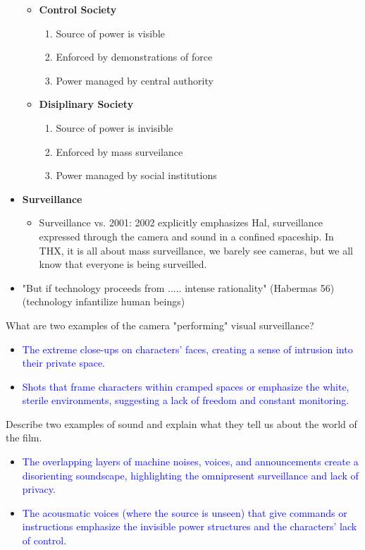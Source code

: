 \documentclass[11pt,fleqn]{book} %
\begin{document}
\begin{itemize}
\begin{itemize}
        \item \textbf{Control Society}
        \begin{enumerate}
            \item Source of power is visible
            \item Enforced by demonstrations of force
            \item Power managed by central authority
        \end{enumerate}
        \item \textbf{Disiplinary Society}
        \begin{enumerate}
            \item Source of power is invisible
            \item Enforced by mass surveilance
            \item Power managed by social institutions
        \end{enumerate}
    \end{itemize}
    \item \textbf{Surveillance}
    \begin{itemize}
        \item Surveillance vs. 2001: 2002 explicitly emphasizes Hal, surveillance expressed through the camera and sound in a confined spaceship. In THX, it is all about mass surveillance, we barely see cameras, but we all know that everyone is being surveilled.
    \end{itemize}
    \item "But if technology proceeds from ..... intense rationality" (Habermas 56) (technology infantilize human beings)
\end{itemize}
\begin{exercise}
What are two examples of the camera "performing" visual surveillance?
\begin{itemize}
\item \textcolor{blue}{The extreme close-ups on characters' faces, creating a sense of intrusion into their private space.}
\item \textcolor{blue}{Shots that frame characters within cramped spaces or emphasize the white, sterile environments, suggesting a lack of freedom and constant monitoring.}
\end{itemize}
\end{exercise}

\begin{exercise}
Describe two examples of sound and explain what they tell us about the world of the film.
\begin{itemize}
\item \textcolor{blue}{The overlapping layers of machine noises, voices, and announcements create a disorienting soundscape, highlighting the omnipresent surveillance and lack of privacy.}
\item \textcolor{blue}{The acousmatic voices (where the source is unseen) that give commands or instructions emphasize the invisible power structures and the characters' lack of control.}
\end{itemize}
\end{exercise}
\end{document}
